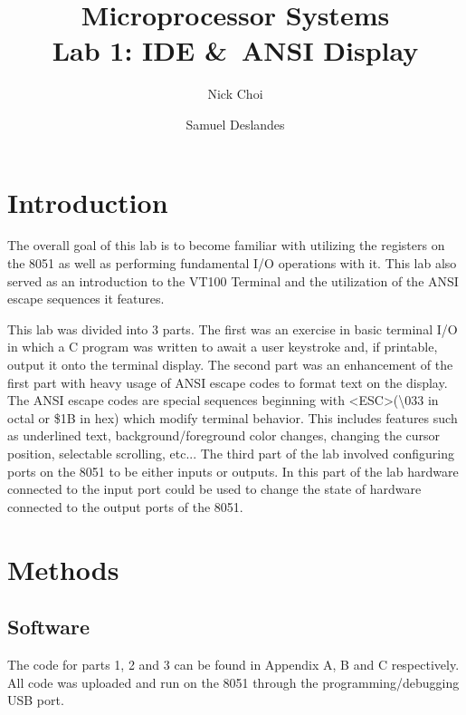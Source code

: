 \documentclass[12pt]{article}
\begin{document}
\title{Microprocessor Systems \\ Lab 1: IDE \&\ ANSI Display}
\author{Nick Choi \and Samuel Deslandes}
\date{}
\maketitle

\section{Introduction}
The overall goal of this lab is to become familiar with utilizing the registers on the 8051 as well as performing fundamental I/O operations with it. This lab also served as an introduction to the VT100 Terminal and the utilization of the ANSI escape sequences it features. 

This lab was divided into 3 parts. The first was an exercise in basic terminal I/O in which a C program was written to await a user keystroke and, if printable, output it onto the terminal display. The second part was an enhancement of the first part with heavy usage of ANSI escape codes to format text on the display. The ANSI escape codes are special sequences beginning with \textless ESC\textgreater (\textbackslash033 in octal or \$1B in hex) which modify terminal behavior. This includes features such as underlined text, background/foreground color changes, changing the cursor position, selectable scrolling, etc... The third part of the lab involved configuring ports on the 8051 to be either inputs or outputs. In this part of the lab hardware connected to the input port could be used to change the state of hardware connected to the output ports of the 8051. 

\section{Methods}
\subsection{Software}
The code for parts 1, 2 and 3 can be found in Appendix A, B and C respectively. All code was uploaded and run on the 8051 through the programming/debugging USB port. 	
\end{document}
